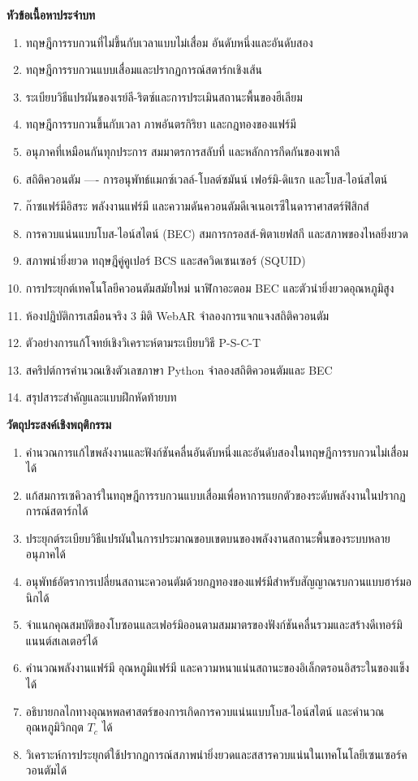 \begin{lessonplanbox}
\noindent\textbf{หัวข้อเนื้อหาประจำบท}
\begin{enumerate}
    \item ทฤษฎีการรบกวนที่ไม่ขึ้นกับเวลาแบบไม่เสื่อม อันดับหนึ่งและอันดับสอง
    \item ทฤษฎีการรบกวนแบบเสื่อมและปรากฏการณ์สตาร์กเชิงเส้น
    \item ระเบียบวิธีแปรผันของเรย์ลี-ริตซ์และการประเมินสถานะพื้นของฮีเลียม
    \item ทฤษฎีการรบกวนขึ้นกับเวลา ภาพอันตรกิริยา และกฎทองของแฟร์มี
    \item อนุภาคที่เหมือนกันทุกประการ สมมาตรการสลับที่ และหลักการกีดกันของเพาลี
    \item สถิติควอนตัม ---- การอนุพัทธ์แมกซ์เวลล์-โบลต์ซมันน์ เฟอร์มิ-ดิแรก และโบส-ไอน์สไตน์
    \item ก๊าซแฟร์มีอิสระ พลังงานแฟร์มี และความดันควอนตัมดีเจเนอเรซีในดาราศาสตร์ฟิสิกส์
    \item การควบแน่นแบบโบส-ไอน์สไตน์ (BEC) สมการกรอสส์-พิตาเยฟสกี และสภาพของไหลยิ่งยวด
    \item สภาพนำยิ่งยวด ทฤษฎีคู่คูเปอร์ BCS และสควิดเซนเซอร์ (SQUID)
    \item การประยุกต์เทคโนโลยีควอนตัมสมัยใหม่ นาฬิกาอะตอม BEC และตัวนำยิ่งยวดอุณหภูมิสูง
    \item ห้องปฏิบัติการเสมือนจริง 3 มิติ WebAR จำลองการแจกแจงสถิติควอนตัม
    \item ตัวอย่างการแก้โจทย์เชิงวิเคราะห์ตามระเบียบวิธี P-S-C-T
    \item สคริปต์การคำนวณเชิงตัวเลขภาษา Python จำลองสถิติควอนตัมและ BEC
    \item สรุปสาระสำคัญและแบบฝึกหัดท้ายบท
\end{enumerate}

\noindent\textbf{วัตถุประสงค์เชิงพฤติกรรม}
\begin{enumerate}
    \item คำนวณการแก้ไขพลังงานและฟังก์ชันคลื่นอันดับหนึ่งและอันดับสองในทฤษฎีการรบกวนไม่เสื่อมได้
    \item แก้สมการเซคิวลาร์ในทฤษฎีการรบกวนแบบเสื่อมเพื่อหาการแยกตัวของระดับพลังงานในปรากฏการณ์สตาร์กได้
    \item ประยุกต์ระเบียบวิธีแปรผันในการประมาณขอบเขตบนของพลังงานสถานะพื้นของระบบหลายอนุภาคได้
    \item อนุพัทธ์อัตราการเปลี่ยนสถานะควอนตัมด้วยกฎทองของแฟร์มีสำหรับสัญญาณรบกวนแบบฮาร์มอนิกได้
    \item จำแนกคุณสมบัติของโบซอนและเฟอร์มิออนตามสมมาตรของฟังก์ชันคลื่นรวมและสร้างดีเทอร์มิแนนต์สเลเตอร์ได้
    \item คำนวณพลังงานแฟร์มี อุณหภูมิแฟร์มี และความหนาแน่นสถานะของอิเล็กตรอนอิสระในของแข็งได้
    \item อธิบายกลไกทางอุณหพลศาสตร์ของการเกิดการควบแน่นแบบโบส-ไอน์สไตน์ และคำนวณอุณหภูมิวิกฤต $T_c$ ได้
    \item วิเคราะห์การประยุกต์ใช้ปรากฏการณ์สภาพนำยิ่งยวดและสสารควบแน่นในเทคโนโลยีเซนเซอร์ควอนตัมได้
\end{enumerate}
\end{lessonplanbox}

